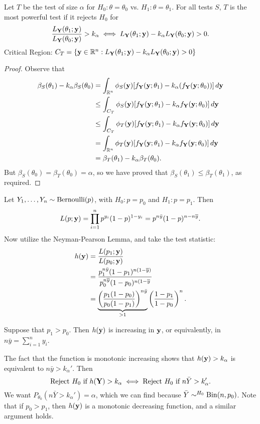\begin{lemma}
Let $T$ be the test of size $\alpha$ for $H_0:\theta=\theta_0$ vs. $H_1:\theta=\theta_1$. For all tests $S$, $T$ is the most powerful test if it rejects $H_0$ for
\[
	\frac{L_\mathbf Y(\theta_1;\mathbf y)}{L_\mathbf Y(\theta_0;\mathbf y)}>k_\alpha \;\Longleftrightarrow\; L_\mathbf Y(\theta_1;\mathbf y)-k_\alpha L_\mathbf Y(\theta_0;\mathbf y)>0
.\] 
Critical Region: $C_T=\{\mathbf y \in \mathbb R^n:L_\mathbf Y(\theta_1;\mathbf y)-k_\alpha L_\mathbf Y(\theta_0;\mathbf y)>0\}$
\end{lemma}
\begin{proof}
	Observe that
\begin{align*}
    \beta_S(\theta_1)-k_\alpha\beta_S(\theta_0)&= \int_{\mathbb R^n} \phi_S(\mathbf y)[f_\mathbf Y(\mathbf y;\theta_1)-k_\alpha(f_\mathbf Y(\mathbf y;\theta_0))]\, d\mathbf y\\
		      &\leq \int_{C_T} \phi_S(\mathbf y)[f_\mathbf Y(\mathbf y;\theta_1)-k_\alpha f_\mathbf Y(\mathbf y;\theta_0)]\, d\mathbf y \\
		      &\leq \int_{C_T} \phi_T(\mathbf y)[f_\mathbf Y(\mathbf y;\theta_1)-k_\alpha f_\mathbf Y(\mathbf y;\theta_0)] \, d\mathbf y \\
		      &= \int_{\mathbb R^n}\phi_T(\mathbf y)[f_\mathbf Y(\mathbf y;\theta_1)-k_\alpha f_\mathbf Y(\mathbf y;\theta_0)] \, d \mathbf y \\
		      &= \beta_T(\theta_1)-k_\alpha\beta_T(\theta_0)
	.\end{align*}
But $\beta_S(\theta_0)=\beta_T(\theta_0)=\alpha$, so we have proved that $\beta_S(\theta_1)\leq \beta_T(\theta_1)$, as required.
\end{proof}


\begin{eg}
	Let $Y_1,\dots,Y_n\sim\operatorname*{Bernoulli}(p)$, with $H_0:p=p_0$ and $H_1:p=p_1$. Then
	\[
		L(p;\mathbf y)=\prod^n_{i=1}p^{y_i}(1-p)^{1-y_i}=p^{n \bar{y}}(1-p)^{n-n\overline{y}}
	.\] 
	Now utilize the Neyman-Pearson Lemma, and take the test statistic:
	\begin{align*}
		h(\mathbf y)&=\frac{L(p_1;\mathbf y)}{L(p_0;\mathbf y)} \\
		      &= \frac{p_1^{n\bar{y}}(1-p_1)^{n(1-\overline{y})}}{p_0^{n\overline{y}}(1-p_0)^{n(1-\overline{y}}} \\
		      &= \underbrace{\left( \frac{p_1(1-p_0)}{p_0(1-p_1)} \right)^{n\bar{y}}}_{>1}\left( \frac{1-p_1}{1-p_0} \right) ^n
	.\end{align*}

Suppose that $p_1>p_0$. Then $h(\mathbf y)$ is increasing in $\mathbf y$, or equivalently, in $n\bar{y}=\sum^n_{i=1}y_i$.


The fact that the function is monotonic increasing shows that $h(\mathbf y)>k_\alpha$ is equivalent to $n\bar{y}>k_\alpha'$. Then
\[
\text{Reject $H_0$ if } h(\mathbf Y)>k_\alpha \;\Longleftrightarrow\; \text{Reject $H_0$ if } n\bar{Y}>k_\alpha'
.\] 
We want $P_{\theta_0}(n\bar{Y}>k_\alpha')=\alpha$, which we can find because $\bar{Y}\sim^{H_0} \operatorname*{Bin}(n,p_0)$. Note that if $p_0>p_1$, then $h(\mathbf y)$ is a monotonic decreasing function, and a similar argument holds. 
\end{eg}

